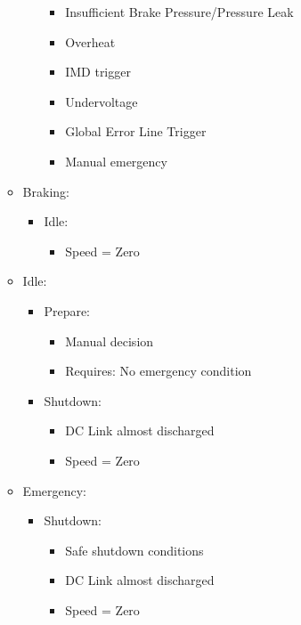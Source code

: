 \begin{itemize}
\begin{itemize}
\begin{itemize}
            \begin{itemize}
                \item Insufficient Brake Pressure/Pressure Leak
                \item Overheat
                \item IMD trigger
                \item Undervoltage
                \item Global Error Line Trigger
                \item Manual emergency
            \end{itemize}
        \end{itemize}
        \item Braking:
        \begin{itemize}
            \item Idle:
            \begin{itemize}
                \item Speed = Zero
            \end{itemize}
        \end{itemize}
        \item Idle:
        \begin{itemize}
            \item Prepare:
            \begin{itemize}
                \item Manual decision
                \item Requires: No emergency condition
            \end{itemize}
            \item Shutdown:
            \begin{itemize}
                \item DC Link almost discharged
                \item Speed = Zero
            \end{itemize}
        \end{itemize}
        \item Emergency:
        \begin{itemize}
            \item Shutdown:
            \begin{itemize}
                \item Safe shutdown conditions
                \item DC Link almost discharged
                \item Speed = Zero
            \end{itemize}
        \end{itemize}
    \end{itemize}
\end{itemize}

